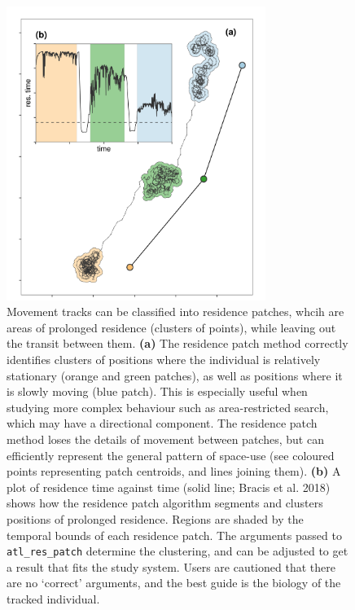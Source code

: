 \documentclass[10pt,paper=a4,headings=standardclasses
]{scrartcl}
\begin{document}
\begin{figure}[h!]
    \centering
    \includegraphics[width=0.75\textwidth]{figures/fig_05_residence.png}
    \caption{Movement tracks can be classified into residence patches, whcih are areas of prolonged residence (clusters of points), while leaving out the transit between them.
    \textbf{(a)} The residence patch method correctly identifies clusters of positions where the individual is relatively stationary (orange and green patches), as well as positions where it is slowly moving (blue patch).
    This is especially useful when studying more complex behaviour such as area-restricted search, which may have a directional component.
    The residence patch method loses the details of movement between patches, but can efficiently represent the general pattern of space-use (see coloured points representing patch centroids, and lines joining them).
    \textbf{(b)} A plot of residence time against time (solid line; Bracis et al. 2018) shows how the residence patch algorithm segments and clusters positions of prolonged residence. 
    Regions are shaded by the temporal bounds of each residence patch.
    The arguments passed to \texttt{atl\_res\_patch} determine the clustering, and can be adjusted to get a result that fits the study system.
    Users are cautioned that there are no `correct' arguments, and the best guide is the biology of the tracked individual.}
    \label{fig:figure_residence_patch}
\end{figure}
\end{document}
